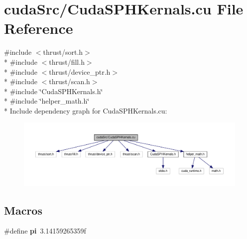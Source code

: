 \hypertarget{_cuda_s_p_h_kernals_8cu}{\section{cuda\-Src/\-Cuda\-S\-P\-H\-Kernals.cu File Reference}
\label{_cuda_s_p_h_kernals_8cu}
}
{\ttfamily \#include $<$thrust/sort.\-h$>$}\\*
{\ttfamily \#include $<$thrust/fill.\-h$>$}\\*
{\ttfamily \#include $<$thrust/device\-\_\-ptr.\-h$>$}\\*
{\ttfamily \#include $<$thrust/scan.\-h$>$}\\*
{\ttfamily \#include \char`\"{}Cuda\-S\-P\-H\-Kernals.\-h\char`\"{}}\\*
{\ttfamily \#include \char`\"{}helper\-\_\-math.\-h\char`\"{}}\\*
Include dependency graph for Cuda\-S\-P\-H\-Kernals.\-cu\-:\nopagebreak
\begin{figure}[H]
\begin{center}
\leavevmode
\includegraphics[width=350pt]{_cuda_s_p_h_kernals_8cu__incl}
\end{center}
\end{figure}
\subsection*{Macros}
\begin{DoxyCompactItemize}
\item 
\hypertarget{_cuda_s_p_h_kernals_8cu_a1daf785e3f68d293c7caa1c756d5cb74}{\#define {\bfseries pi}~3.\-14159265359f}\label{_cuda_s_p_h_kernals_8cu_a1daf785e3f68d293c7caa1c756d5cb74}

\end{DoxyCompactItemize}
